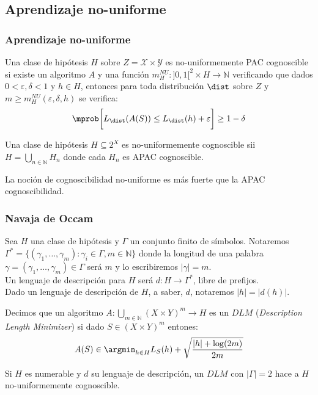 \subsection{Aprendizaje no-uniforme}
\begin{frame}\frametitle{Aprendizaje no-uniforme}
 \begin{definition}
  Una clase de hipótesis $H$ sobre $Z=\mathcal{X} \times \mathcal{Y}$ es no-uniformemente PAC cognoscible si existe
  un algoritmo $A$ y una función $m_{H}^{NU} : ]0,1[^2 \times H \rightarrow \mathbb{N}$ verificando que dados 
  $0 < \varepsilon, \delta < 1$ y $h \in H$, entonces para toda distribución $\dist$ sobre $Z$ y
  $m\ge m_{H}^{NU} (\varepsilon, \delta, h)$ se verifica:
  \[
    \mprob\bigg[L_{\dist}(A(S)) \le L_{\dist}(h) + \varepsilon\bigg] \ge 1-\delta
  \]
 \end{definition}

 \begin{theorem}
  Una clase de hipótesis $H \subseteq 2^X$ es no-uniformemente cognoscible sii $H = \bigcup_{n\in\mathbb{N}} H_n$ donde
  cada $H_n$ es APAC cognoscible.
 \end{theorem}
 
 \begin{corollary}
  La noción de cognoscibilidad no-uniforme es más fuerte que la APAC cognoscibilidad.
 \end{corollary}
\end{frame}

\begin{frame}\frametitle{Navaja de Occam}
 \begin{definition}
  Sea $H$ una clase de hipótesis y $\Gamma$ un conjunto finito de símbolos. Notaremos 
  $\Gamma^{\ast} = \{(\gamma_1, \ldots, \gamma_m): \gamma_i \in \Gamma, m\in \mathbb{N}\}$
  donde la longitud de una palabra $\gamma = (\gamma_1, \ldots, \gamma_m) \in \Gamma$ será $m$ y lo escribiremos $|\gamma| = m$.\\
  \medskip
  Un lenguaje de descripción para $H$ será $d: H \rightarrow \Gamma^{\ast}$, libre de prefijos.\\
  \medskip  
  Dado un lenguaje de descripción de $H$, a saber, $d$, notaremos $|h| = |d(h)|$.
 \end{definition}
 
 \begin{definition}
  Decimos que un algoritmo $A: \underset{m\in \mathbb{N}}{\bigcup} (X\times Y)^m \rightarrow H$ es un $DLM$ 
  (\textit{Description Length Minimizer}) si dado $S \in (X\times Y)^m$ entones:
  \[
   A(S) \in \argmin_{h\in H} L_S(h) + \sqrt{\frac{|h| + \log(2m)}{2m}} 
  \]
 \end{definition}
 
 \vspace{-2em}
 
 \begin{theorem}
 Si $H$ es numerable y $d$ su lenguaje de descripción, un $DLM$ con $|\Gamma| = 2$ hace a $H$ no-uniformemente cognoscible.
 \end{theorem}
\end{frame}